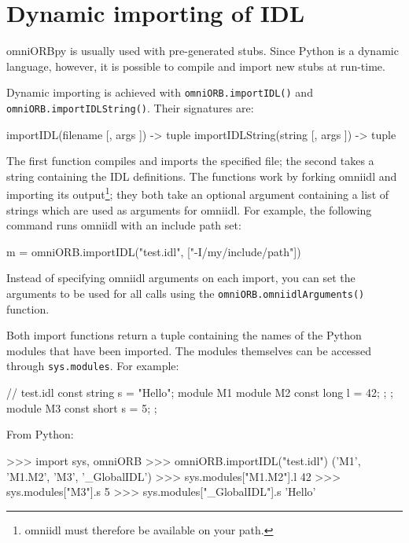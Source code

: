\documentclass[11pt,oneside,a4paper]{book}
\newcommand{\code}[1]{\texttt{#1}}
\newcommand{\op}[1]{\texttt{#1()}}
\newcommand{\dsc}{\discretionary{}{}{}}
\begin{document}
\section{Dynamic importing of IDL}
\label{sec:importIDL}

omniORBpy is usually used with pre-generated stubs. Since Python is a
dynamic language, however, it is possible to compile and import new
stubs at run-time.

Dynamic importing is achieved with \op{omniORB.importIDL} and
\op{omniORB.\dsc{}importIDLString}. Their signatures are:

\begin{pylisting}
importIDL(filename [, args ]) -> tuple
importIDLString(string [, args ]) -> tuple
\end{pylisting}

The first function compiles and imports the specified file; the second
takes a string containing the IDL definitions. The functions work by
forking omniidl and importing its output\footnote{omniidl must
therefore be available on your path.}; they both take an optional
argument containing a list of strings which are used as arguments for
omniidl. For example, the following command runs omniidl with an
include path set:

\begin{pylisting}
m = omniORB.importIDL("test.idl", ["-I/my/include/path"])
\end{pylisting}

Instead of specifying omniidl arguments on each import, you can set
the arguments to be used for all calls using the
\op{omniORB.omniidlArguments} function.

Both import functions return a tuple containing the names of the
Python modules that have been imported. The modules themselves can be
accessed through \code{sys.modules}. For example:

\begin{idllisting}
// test.idl
const string s = "Hello";
module M1 {
  module M2 {
    const long l = 42;
  };
};
module M3 {
  const short s = 5;
};
\end{idllisting}

\noindent From Python:

\begin{pylisting}
>>> import sys, omniORB
>>> omniORB.importIDL("test.idl")
('M1', 'M1.M2', 'M3', '_GlobalIDL')
>>> sys.modules["M1.M2"].l
42
>>> sys.modules["M3"].s
5
>>> sys.modules["_GlobalIDL"].s
'Hello'
\end{pylisting}
\end{document}
